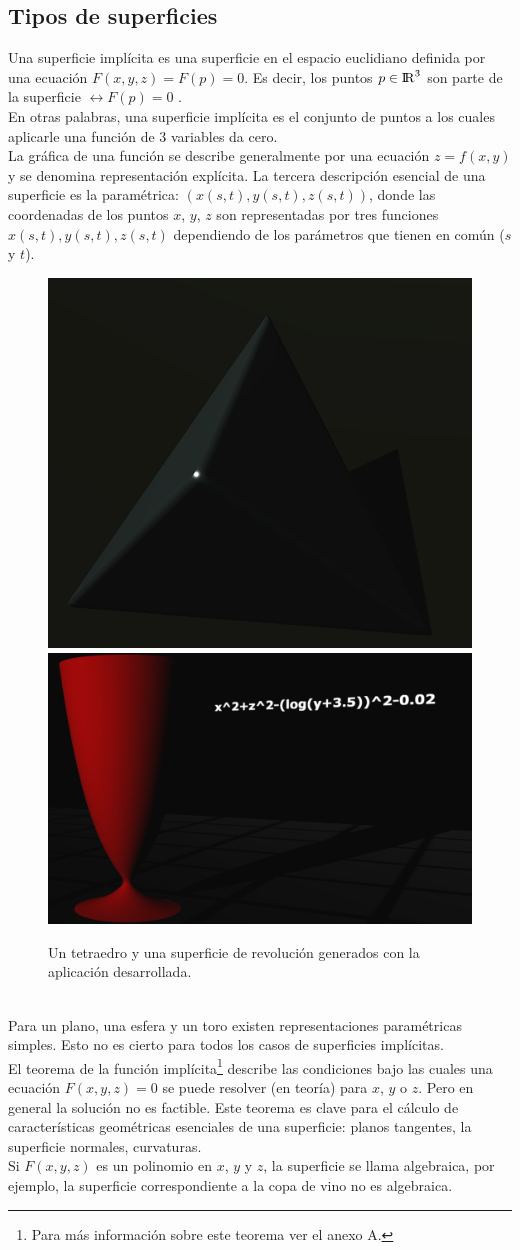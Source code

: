 \documentclass[12pt]{article}
\begin{document}
\subsection{Tipos de superficies}
Una superficie implícita es una superficie en el espacio euclidiano definida por una ecuación $F (x, y, z) =  F(p) = 0$.  Es decir, los  puntos $ p \in {\rm I\!R} ^3$ son parte de la superficie $ \leftrightarrow F(p) = 0$ \cite{realtimerendering}.
\\En otras palabras, una superficie implícita es el conjunto de puntos a los cuales aplicarle una función de 3 variables da cero. 
\\La gráfica de una función se describe generalmente por una ecuación $z = f (x, y)$ y se denomina  representación explícita\cite{implicitas}\cite{realtimerendering}. La tercera descripción esencial de una superficie es la paramétrica: $(x(s, t), y (s, t), z (s, t))$, donde las coordenadas de los puntos $x$, $y$, $z$ son representadas por tres funciones $x(s, t), y(s, t) , z(s, t)$ dependiendo de los parámetros que tienen en común ($s$ y $t$).
\begin{figure}[ht]
\includegraphics[width =0.45\linewidth]{tetraedro.png}
\hfill
\includegraphics[width =0.45\linewidth]{copa.png}
\caption{ Un tetraedro y una superficie de revolución generados con la aplicación desarrollada.}
\label{ fig : surface }
\end{figure}
\\Para un plano, una esfera y un toro existen representaciones paramétricas simples. Esto no es cierto para todos los casos de superficies implícitas.
\\El teorema de la función implícita\footnote{Para más información sobre este teorema ver el anexo A.} describe las condiciones bajo las cuales una ecuación $F (x, y, z) = 0$ se puede resolver (en teoría) para $x$, $y$ o $z$. Pero en general la solución no es factible. Este teorema es clave para el cálculo de características geométricas esenciales de una superficie: planos tangentes, la superficie normales, curvaturas.
\\Si $F (x, y, z)$ es un polinomio en $x$, $y$ y $z$, la superficie se llama algebraica,  por ejemplo, la superficie correspondiente a la copa de vino no es algebraica.
\end{document}
